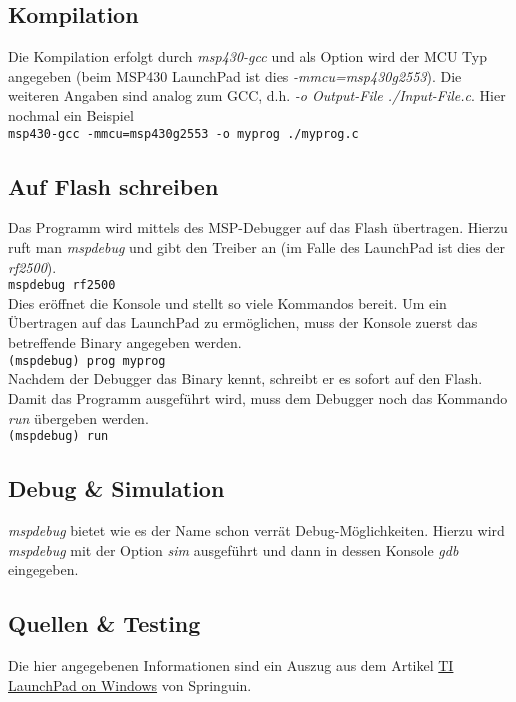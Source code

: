 \subsection{Kompilation}
Die Kompilation erfolgt durch \emph{msp430-gcc} und als Option wird der MCU Typ
angegeben (beim MSP430 LaunchPad ist dies \emph{-mmcu=msp430g2553}). Die weiteren
Angaben sind analog zum GCC, d.h. \emph{-o Output-File ./Input-File.c}.
Hier nochmal ein Beispiel \\

\verb?msp430-gcc -mmcu=msp430g2553 -o myprog ./myprog.c?

\subsection{Auf Flash schreiben}
Das Programm wird mittels des MSP-Debugger auf das Flash übertragen. Hierzu
ruft man \emph{mspdebug} und gibt den Treiber an (im Falle des LaunchPad ist
dies der \emph{rf2500}).\\

\verb?mspdebug rf2500?\\

\noindent
Dies eröffnet die Konsole und stellt so viele Kommandos bereit. Um ein 
Übertragen auf das LaunchPad zu ermöglichen, muss der Konsole zuerst das
betreffende Binary angegeben werden.\\

\verb?(mspdebug) prog myprog?\\

\noindent
Nachdem der Debugger das Binary kennt, schreibt er es sofort auf den Flash.
Damit das Programm ausgeführt wird, muss dem Debugger noch das Kommando 
\emph{run} übergeben werden.\\

\verb?(mspdebug) run?

\subsection{Debug \& Simulation}
\emph{mspdebug} bietet wie es der Name schon verrät Debug-Möglichkeiten.
Hierzu wird \emph{mspdebug} mit der Option \emph{sim} ausgeführt und
dann in dessen Konsole \emph{gdb} eingegeben.

\subsection{Quellen \& Testing}
Die hier angegebenen Informationen sind ein Auszug aus dem Artikel
\href{http://springuin.nl/articles/launchpadwindows}{TI LaunchPad on Windows} 
von Springuin. 

